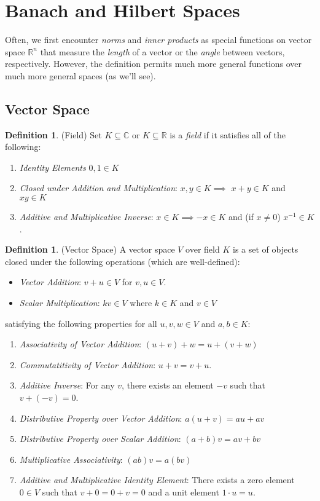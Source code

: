 \documentclass[12pt]{article}
\numberwithin{equation}{section} %
\theoremstyle{plain}
\theoremstyle{definition}
\newtheorem{defn}[thm]{Definition}
\theoremstyle{remark}
\newcommand{\R}{\mathbb{R}}
\newcommand{\Rn}{\mathbb{R}^n}
\newcommand{\C}{\mathbb{C}}
\begin{document}
\clearpage
\section{Banach and Hilbert Spaces}
\label{sec:banachhilbert}

Often, we first encounter \emph{norms} and \emph{inner products} as
special functions on vector space $\Rn$ that measure the \emph{length}
of a vector or the \emph{angle} between vectors, respectively.  However,
the definition permits much more general functions over much more
general spaces (as we'll see).

\subsection{Vector Space}

\begin{defn}(Field)
Set $K\subseteq \C$ or $K\subseteq\R$ is a \emph{field} if it satisfies
all of the following:
\begin{enumerate}[label=(\roman*)]
  \item \emph{Identity Elements} $0,1\in K$
  \item \emph{Closed under Addition and Multiplication}:
      $x,y\in K \implies$ $x+y\in K$ and $xy\in K$
  \item \emph{Additive and Multiplicative Inverse}:
    $x\in K \implies -x\in K$
    and (if $x\neq 0$) $x^{-1}\in K$.
\end{enumerate}
\end{defn}

\begin{defn}(Vector Space)
A vector space $V$ over field $K$ is a set of objects closed under the
following operations (which are well-defined):
\begin{itemize}
  \item \emph{Vector Addition}: $v+u\in V$ for $v,u\in V$.
  \item \emph{Scalar Multiplication}: $kv\in V$ where $k\in K$ and $v\in
    V$
\end{itemize}
satisfying the following properties for all $u,v,w\in V$ and $a,b\in K$:
\begin{enumerate}[label=(\roman*)]
  \item \emph{Associativity of Vector Addition}: $(u+v)+w = u + (v+w)$
  \item \emph{Commutatitivity of Vector Addition}: $u+v=v+u$.
  \item \emph{Additive Inverse}: For any $v$, there exists an element
    $-v$ such that $v+(-v)=0$.
  \item \emph{Distributive Property over Vector Addition}:
    $a(u+v) = au + av$
  \item \emph{Distributive Property over Scalar Addition}:
    $(a+b)v = av + bv$
  \item \emph{Multiplicative Associativity}: $(ab)v = a(bv)$
  \item \emph{Additive and Multiplicative Identity Element}:
    There exists a zero element $0\in V$ such that $v+0 = 0+v=0$ and a
    unit element $1\cdot u = u$.
\end{enumerate}
\end{defn}
\end{document}
